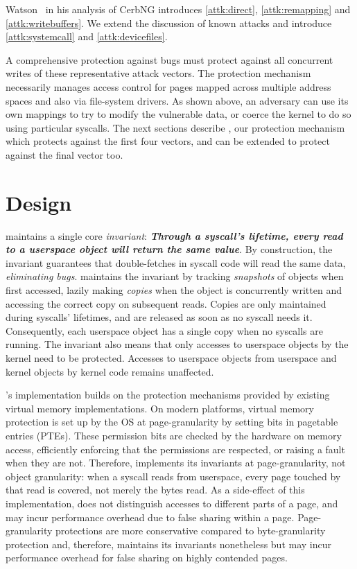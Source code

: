 \documentclass[letterpaper,twocolumn,10pt, anonymous]{article}
\begin{document}
Watson~\cite{watson2007exploiting} in his analysis of CerbNG introduces
\autoref{attk:direct}, \autoref{attk:remapping} and \autoref{attk:writebuffers}.
We extend the discussion of known attacks and introduce
\autoref{attk:systemcall} and \autoref{attk:devicefiles}.

A comprehensive protection against \tocttou bugs must protect against 
all concurrent writes of these representative attack vectors.
The protection mechanism necessarily manages access control for pages
mapped across multiple address spaces and also via file-system drivers.
As shown above, an adversary can use its own mappings to try to modify the
vulnerable data, or coerce the kernel to do so using particular syscalls.
The next sections describe \tiktok, our protection mechanism which 
protects against the first four vectors, and can be extended to protect 
against the final vector too.


\section{\tiktok Design} 
\label{sec:design}

\tiktok maintains a single core \emph{invariant}:
\textbf{\emph{Through a syscall's lifetime, every read to a userspace object 
will return the same value}}.
By construction, the invariant guarantees that double-fetches in syscall
code will read the same data, \emph{eliminating \tocttou bugs}.
\tiktok maintains the invariant by tracking \emph{snapshots} of objects
when first accessed, lazily making \emph{copies} when the object is concurrently 
written and accessing the correct copy on subsequent reads.
Copies are only maintained during syscalls' lifetimes, and are released as 
soon as no syscall needs it.
Consequently, each userspace object has a single copy when no syscalls are
running.
The invariant also means that only accesses to userspace objects by the kernel
need to be protected. 
Accesses to userspace objects from userspace and kernel objects by kernel 
code remains unaffected.

\tiktok's implementation builds on the protection mechanisms provided by 
existing virtual memory implementations.
On modern platforms, virtual memory protection is set up by the OS at
page-granularity by setting bits in pagetable entries (PTEs).
These permission bits are checked by the hardware on memory access, 
efficiently enforcing that the permissions are respected, or raising 
a fault when they are not.
Therefore, \tiktok implements its invariants at page-granularity, not object 
granularity: when a syscall reads from userspace, every page touched by that 
read is covered, not merely the bytes read.
As a side-effect of this implementation, \tiktok does not distinguish
accesses to different parts of a page, and may incur performance overhead due
to false sharing within a page. 
Page-granularity protections are more conservative compared to byte-granularity
protection and, therefore, \tiktok maintains its invariants nonetheless but may
incur performance overhead for false sharing on highly contended pages.
\end{document}
